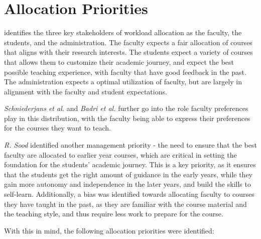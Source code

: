 \section{Allocation Priorities}

\cite{harwood1975optimizing} identifies the three key stakeholders of workload allocation as the faculty, the students, and the administration. The faculty expects a fair allocation of courses that aligns with their research interests. The students expect a variety of courses that allows them to customize their academic journey, and expect the best possible teaching experience, with faculty that have good feedback in the past. The administration expects a optimal utilization of faculty, but are largely in alignment with the faculty and student expectations.

\textit{Schniederjans et al.} and \textit{Badri et al.} \cite{schniederjans1987goal, badri1998multi} further go into the role faculty preferences play in this distribution, with the faculty being able to express their preferences for the courses they want to teach.

\textit{R. Sood} \cite{rohan2017} identified another management priority - the need to ensure that the best faculty are allocated to earlier year courses, which are critical in setting the foundation for the students' academic journey. This is a key priority, as it ensures that the students get the right amount of guidance in the early years, while they gain more autonomy and independence in the later years, and build the skills to self-learn. Additionally, a bias was identified towards allocating faculty to courses they have taught in the past, as they are familiar with the course material and the teaching style, and thus require less work to prepare for the course.

With this in mind, the following allocation priorities were identified:

